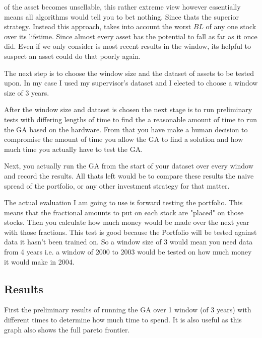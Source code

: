 \documentclass[11pt]{article}
\begin{document}
    of the asset becomes unsellable, this rather extreme view however essentially means all
    algorithms would tell you to bet nothing. Since thats the superior strategy. Instead
    this approach, takes into account the worst \(BL\) of any one stock over its lifetime.
    Since almost every asset has the potential to fall as far as it once did. Even if we only
    consider is most recent results in the window, its helpful to suspect an asset could
    do that poorly again.

    The next step is to choose the window size and the dataset of assets to be tested upon.
    In my case I used my supervisor's dataset \cite{Dataset} and I elected to choose a window
    size of 3 years.

    After the window size and dataset is chosen the next stage is to run preliminary tests with
    differing lengths of time to find the a reasonable amount of time to run the GA based on
    the hardware. From that you have make a human decision to compromise the amount of time
    you allow the GA to find a solution and how much time you actually have to test the GA.

    Next, you actually run the GA from the start of your dataset over every window and record
    the results. All thats left would be to compare these results the naive spread of the
    portfolio, or any other investment strategy for that matter.

    The actual evaluation I am going to use is forward testing the portfolio. This means that
    the fractional amounts to put on each stock are "placed" on those stocks. Then you
    calculate how much money would be made over the next year with those fractions. This test
    is good because the Portfolio will be tested against data it hasn't been trained on.
    So a window size of 3 would mean you need data from 4 years i.e. a window of 2000 to 2003
    would be tested on how much money it would make in 2004.

\subsection{Results}

    First the preliminary results of running the GA over 1 window (of 3 years) with different
    times to determine how much time to spend. It is also useful as this graph also shows
    the full pareto frontier.
\end{document}
